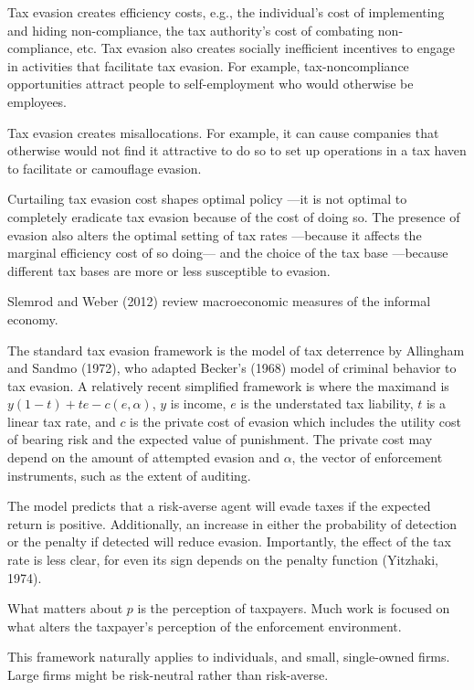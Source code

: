 \documentclass[
  12pt]{article}
\theoremstyle{definition}
\theoremstyle{remark}
\begin{document}
Tax evasion creates efficiency costs, e.g., the individual's cost of
implementing and hiding non-compliance, the tax authority's cost of
combating non-compliance, etc. Tax evasion also creates socially
inefficient incentives to engage in activities that facilitate tax
evasion. For example, tax-noncompliance opportunities attract people to
self-employment who would otherwise be employees.

Tax evasion creates misallocations. For example, it can cause companies
that otherwise would not find it attractive to do so to set up
operations in a tax haven to facilitate or camouflage evasion.

Curtailing tax evasion cost shapes optimal policy ---it is not optimal
to completely eradicate tax evasion because of the cost of doing so. The
presence of evasion also alters the optimal setting of tax rates
---because it affects the marginal efficiency cost of so doing--- and
the choice of the tax base ---because different tax bases are more or
less susceptible to evasion.

Slemrod and Weber (2012) review macroeconomic measures of the informal
economy.

The standard tax evasion framework is the model of tax deterrence by
Allingham and Sandmo (1972), who adapted Becker's (1968) model of
criminal behavior to tax evasion. A relatively recent simplified
framework is where the maximand is \(y(1-t)+te-c(e,\alpha)\), \(y\) is
income, \(e\) is the understated tax liability, \(t\) is a linear tax
rate, and \(c\) is the private cost of evasion which includes the
utility cost of bearing risk and the expected value of punishment. The
private cost may depend on the amount of attempted evasion and
\(\alpha\), the vector of enforcement instruments, such as the extent of
auditing.

The model predicts that a risk-averse agent will evade taxes if the
expected return is positive. Additionally, an increase in either the
probability of detection or the penalty if detected will reduce evasion.
Importantly, the effect of the tax rate is less clear, for even its sign
depends on the penalty function (Yitzhaki, 1974).

What matters about \(p\) is the perception of taxpayers. Much work is
focused on what alters the taxpayer's perception of the enforcement
environment.

This framework naturally applies to individuals, and small, single-owned
firms. Large firms might be risk-neutral rather than risk-averse.
\end{document}
